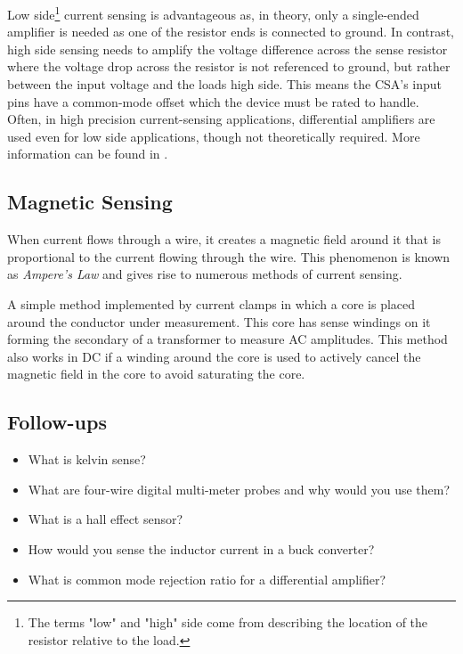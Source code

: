 \documentclass[main.tex]{subfiles}
\begin{document}
\noindent Low side\footnote{The terms "low" and "high" side come from describing the location of the resistor relative to the load.} current sensing is advantageous as, in theory, only a single-ended amplifier is needed as one of the resistor ends is connected to ground. In contrast, high side sensing needs to amplify the voltage difference across the sense resistor where the voltage drop across the resistor is not referenced to ground, but rather between the input voltage and the loads high side. This means the CSA's input pins have a common-mode offset which the device must be rated to handle. Often, in high precision current-sensing applications, differential amplifiers are used even for low side applications, though not theoretically required. More information can be found in . %

\subsection{Magnetic Sensing}
When current flows through a wire, it creates a magnetic field around it that is proportional to the current flowing through the wire. This phenomenon is known as \textit{Ampere's Law} and gives rise to numerous methods of current sensing. \newline

\newnoindentpara A simple method implemented by current clamps in which a core is placed around the conductor under measurement. This core has sense windings on it forming the secondary of a transformer to measure AC amplitudes. This method also works in DC if a winding around the core is used to actively cancel the magnetic field in the core to avoid saturating the core.  

\subsection{Follow-ups}
\begin{itemize}
    \item What is kelvin sense? 
    \item What are four-wire digital multi-meter probes and why would you use them?
    \item What is a hall effect sensor?
    \item How would you sense the inductor current in a buck converter?
    \item What is common mode rejection ratio for a differential amplifier?
\end{itemize}
\end{document}
